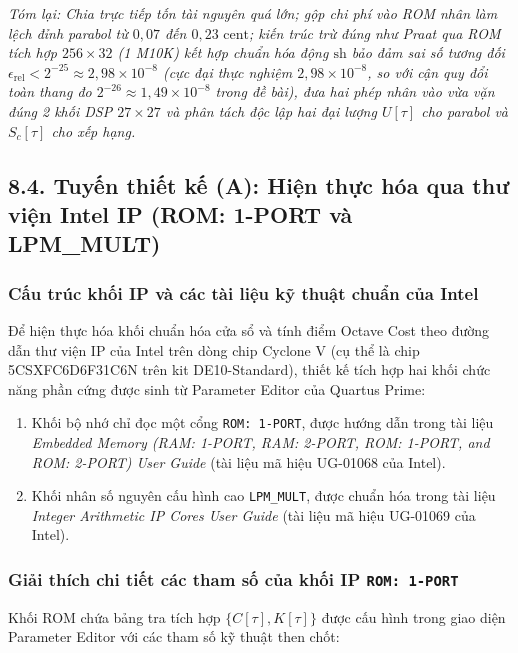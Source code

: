 \textit{Tóm lại: Chia trực tiếp tốn tài nguyên quá lớn; gộp chi phí vào ROM nhân làm lệch đỉnh parabol từ $0{,}07$ đến $0{,}23\text{ cent}$; kiến trúc trừ đúng như Praat qua ROM tích hợp $256 \times 32$ (1 M10K) kết hợp chuẩn hóa động $\text{sh}$ bảo đảm sai số tương đối $\epsilon_{\text{rel}} < 2^{-25} \approx 2{,}98 \times 10^{-8}$ (cực đại thực nghiệm $2{,}98 \times 10^{-8}$, so với cận quy đổi toàn thang đo $2^{-26} \approx 1{,}49 \times 10^{-8}$ trong đề bài), đưa hai phép nhân vào vừa vặn đúng 2 khối DSP $27 \times 27$ và phân tách độc lập hai đại lượng $U[\tau]$ cho parabol và $S_c[\tau]$ cho xếp hạng.}


\subsection*{8.4. Tuyến thiết kế (A): Hiện thực hóa qua thư viện Intel IP (ROM: 1-PORT và LPM\_MULT)}

\subsubsection*{Cấu trúc khối IP và các tài liệu kỹ thuật chuẩn của Intel}
Để hiện thực hóa khối chuẩn hóa cửa sổ và tính điểm Octave Cost theo đường dẫn thư viện IP của Intel trên dòng chip Cyclone V (cụ thể là chip 5CSXFC6D6F31C6N trên kit DE10-Standard), thiết kế tích hợp hai khối chức năng phần cứng được sinh từ Parameter Editor của Quartus Prime:
\begin{enumerate}[leftmargin=1.5em, itemsep=2pt]
    \item Khối bộ nhớ chỉ đọc một cổng \texttt{ROM: 1-PORT}, được hướng dẫn trong tài liệu \emph{Embedded Memory (RAM: 1-PORT, RAM: 2-PORT, ROM: 1-PORT, and ROM: 2-PORT) User Guide} (tài liệu mã hiệu UG-01068 của Intel).
    \item Khối nhân số nguyên cấu hình cao \texttt{LPM\_MULT}, được chuẩn hóa trong tài liệu \emph{Integer Arithmetic IP Cores User Guide} (tài liệu mã hiệu UG-01069 của Intel).
\end{enumerate}

\subsubsection*{Giải thích chi tiết các tham số của khối IP \texttt{ROM: 1-PORT}}
Khối ROM chứa bảng tra tích hợp $\{C[\tau], K[\tau]\}$ được cấu hình trong giao diện Parameter Editor với các tham số kỹ thuật then chốt:

